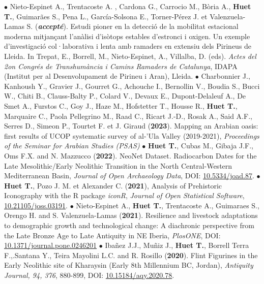 \documentclass{article}
\begin{document}
{\smallbreak
$\bullet$ Nieto-Espinet A., Trentacoste A. , Cardona G., Carrocio M.,  Bòria A., \textbf{Huet T.}, Guimarães S., Pena L., García-Solsona E., Torner-Pérez J. et  Valenzuela-Lamas S. (\textit{\textbf{accepté}}). Estudi pioner en la detecció de la mobilitat estacional moderna mitjançant l'anàlisi d'isòtops estables d'estronci i oxigen. Un exemple d'investigació col·laborativa i lenta amb ramaders en extensiu dels Pirineus de Lleida. In Trepat, E., Borrell, M., Nieto-Espinet, A., Villalba, D. (eds). \textit{Actes del 2on Congrés de Transhumància i Camins Ramaders de Catalunya}, IDAPA (Institut per al Desenvolupament de Pirineu i Aran), Lleida. 
\smallbreak
$\bullet$ Charbonnier J., Kanhoush Y., Gravier J., Gourret G., Achouche I., Bernollin V., Boudia S., Bucci W., Chiti B., Clauss-Balty P., Colard V., Devaux E., Dupont-Delaleuf A., De Smet A., Furstos C., Goy J., Haze M., Hofstetter T., Housse R., \textbf{Huet T.}, Marquaire C., Paola Pellegrino M., Raad C., Ricart J.-D., Rosak A., Said A.F., Serres D., Simeon P., Tourtet F. et J. Giraud (\textbf{2023}). Mapping an Arabian oasis: first results of UCOP systematic survey of al-'Ula Valley (2019-2021), \textit{Proceedings of the Seminar for Arabian Studies (PSAS)}
\smallbreak
$\bullet$ \textbf{Huet T.}, Cubas M., Gibaja J.F., Oms F.X. and N. Mazzucco (\textbf{2022}). NeoNet Dataset. Radiocarbon Dates for the Late Mesolithic/Early Neolithic Transition in the North Central-Western Mediterranean Basin, \textit{Journal of Open Archaeology Data}, DOI: \href{http://doi.org/10.5334/joad.87}{10.5334/joad.87}.
\smallbreak
$\bullet$ \textbf{Huet T.}, Pozo J. M. et Alexander C. (\textbf{2021}), Analysis of Prehistoric Iconography with the R package \textit{iconR}, \textit{Journal of Open Statistical Software}, \href{https://joss.theoj.org/papers/10.21105/joss.03191}{10.21105/joss.03191}.
\smallbreak
$\bullet$ Nieto-Espinet A., \textbf{Huet T.}, Trentacoste A., Guimaraes S., Orengo H. and S. Valenzuela-Lamas (\textbf{2021}). Resilience and livestock adaptations to demographic growth and technological change: A diachronic perspective from the Late Bronze Age to Late Antiquity in NE Iberia, \textit{PlosONE}, DOI: \href{https://doi.org/10.1371/journal.pone.0246201}{10.1371/journal.pone.0246201}
\smallbreak
$\bullet$ Iba\~{n}ez J.J., Mu\~{n}iz J., \textbf{Huet T.}, Borrell Terra F.,.Santana Y., Teira Mayolini L.C. and R. Rosillo (\textbf{2020}). Flint Figurines in the Early Neolithic site of Kharaysin (Early 8th Millennium BC, Jordan), \textit{Antiquity Journal, 94, 376}, 880-899, DOI: \href{https://doi.org/10.15184/aqy.2020.78}{10.15184/aqy.2020.78}.
}
\end{document}
